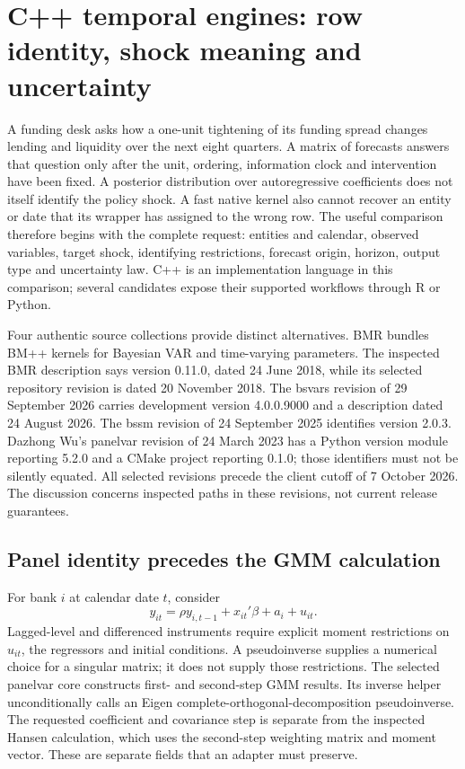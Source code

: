 \section{C++ temporal engines: row identity, shock meaning and uncertainty}
\label{sec:exec25-cxx-dynamic}

A funding desk asks how a one-unit tightening of its funding spread changes lending and liquidity over the next eight quarters. A matrix of forecasts answers that question only after the unit, ordering, information clock and intervention have been fixed. A posterior distribution over autoregressive coefficients does not itself identify the policy shock. A fast native kernel also cannot recover an entity or date that its wrapper has assigned to the wrong row. The useful comparison therefore begins with the complete request: entities and calendar, observed variables, target shock, identifying restrictions, forecast origin, horizon, output type and uncertainty law. C++ is an implementation language in this comparison; several candidates expose their supported workflows through R or Python.

Four authentic source collections provide distinct alternatives. BMR bundles BM++ kernels for Bayesian VAR and time-varying parameters. The inspected BMR description says version 0.11.0, dated 24 June 2018, while its selected repository revision is dated 20 November 2018. The bsvars revision of 29 September 2026 carries development version 4.0.0.9000 and a description dated 24 August 2026. The bssm revision of 24 September 2025 identifies version 2.0.3. Dazhong Wu's panelvar revision of 24 March 2023 has a Python version module reporting 5.2.0 and a CMake project reporting 0.1.0; those identifiers must not be silently equated. All selected revisions precede the client cutoff of 7 October 2026. The discussion concerns inspected paths in these revisions, not current release guarantees.~\citep{exec25_cdyn_bmr,exec25_cdyn_bsvars,exec25_cdyn_bssm,exec25_cdyn_panelvar}

\subsection{Panel identity precedes the GMM calculation}

For bank $i$ at calendar date $t$, consider
\[
 y_{it}=\rho y_{i,t-1}+x_{it}'\beta+a_i+u_{it}.
\]
Lagged-level and differenced instruments require explicit moment restrictions on $u_{it}$, the regressors and initial conditions. A pseudoinverse supplies a numerical choice for a singular matrix; it does not supply those restrictions. The selected panelvar core constructs first- and second-step GMM results. Its inverse helper unconditionally calls an Eigen complete-orthogonal-decomposition pseudoinverse. The requested coefficient and covariance step is separate from the inspected Hansen calculation, which uses the second-step weighting matrix and moment vector. These are separate fields that an adapter must preserve.~\citep{exec25_cdyn_panelvar}

